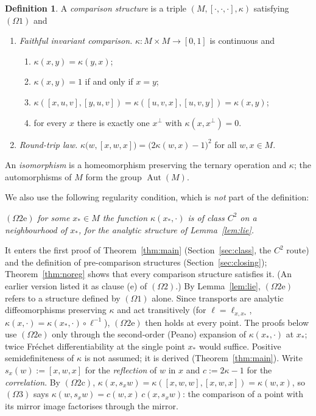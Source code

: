 \documentclass[11pt,reqno]{amsart}
\theoremstyle{definition}
\newtheorem{definition}[theorem]{Definition}
\theoremstyle{remark}
\numberwithin{equation}{section}
\newcommand{\Aut}{\operatorname{Aut}}
\newcommand{\hp}[3]{[#1,#2,#3]}
\begin{document}
\begin{definition}\label{def:cs}
A \emph{comparison structure} is a triple $(M,\hp\cdot\cdot\cdot,\kappa)$ satisfying $(\Omega1)$ and
\begin{enumerate}[label=$(\Omega\arabic*)$,leftmargin=3.2em,start=2]
\item \emph{Faithful invariant comparison.}  $\kappa\colon M\times M\to[0,1]$ is continuous and
\begin{enumerate}[label=(\alph*)]
\item $\kappa(x,y)=\kappa(y,x)$;
\item $\kappa(x,y)=1$ if and only if $x=y$;
\item $\kappa(\hp xuv,\hp yuv)=\kappa(\hp uvx,\hp uvy)=\kappa(x,y)$;
\item for every $x$ there is exactly one $x^\perp$ with $\kappa(x,x^\perp)=0$.
\end{enumerate}
\item \emph{Round-trip law.}  $\kappa\bigl(w,\hp xwx\bigr)=\bigl(2\kappa(w,x)-1\bigr)^2$ for all $w,x\in M$.
\end{enumerate}
An \emph{isomorphism} is a homeomorphism preserving the ternary operation and $\kappa$; the automorphisms of $M$ form the
group $\Aut(M)$.
\end{definition}

We also use the following regularity condition, which is \emph{not} part of the definition:

\smallskip\noindent$(\Omega2\mathrm e)$ \emph{for some $x_*\in M$ the function $\kappa(x_*,\cdot)$ is of class $C^2$ on a neighbourhood of
$x_*$, for the analytic structure of Lemma~\ref{lem:lie}.}

\smallskip\noindent It enters the first proof of Theorem~\ref{thm:main} (Section~\ref{sec:class}, the $C^2$ route) and the definition of
pre-comparison structures (Section~\ref{sec:closing}); Theorem~\ref{thm:noreg} shows that every comparison structure satisfies it.  (An earlier version
listed it as clause (e) of $(\Omega2)$.)  By Lemma~\ref{lem:lie}, $(\Omega2\mathrm e)$ refers to a structure defined by $(\Omega1)$ alone.  Since transports are analytic diffeomorphisms preserving $\kappa$ and act
transitively (for $\ell=\ell_{x,x_*}$, $\kappa(x,\cdot)=\kappa(x_*,\cdot)\circ\ell^{-1}$), $(\Omega2\mathrm e)$ then
holds at every point.  The proofs below use $(\Omega2\mathrm e)$ only through the second-order (Peano) expansion of
$\kappa(x_*,\cdot)$ at $x_*$; twice Fr\'echet differentiability at the single point $x_*$ would suffice.  Positive semidefiniteness of $\kappa$ is
not assumed; it is derived (Theorem~\ref{thm:main}).  Write $s_x(w):=\hp xwx$ for the \emph{reflection} of $w$ in $x$ and
$c:=2\kappa-1$ for the \emph{correlation}.  By $(\Omega2\mathrm c)$,
$\kappa(x,s_xw)=\kappa(\hp xww,\hp xwx)=\kappa(w,x)$, so $(\Omega3)$ says
$\kappa(w,s_xw)=c(w,x)\,c(x,s_xw)$: the comparison of a point with its mirror image factorises through
the mirror.
\end{document}
